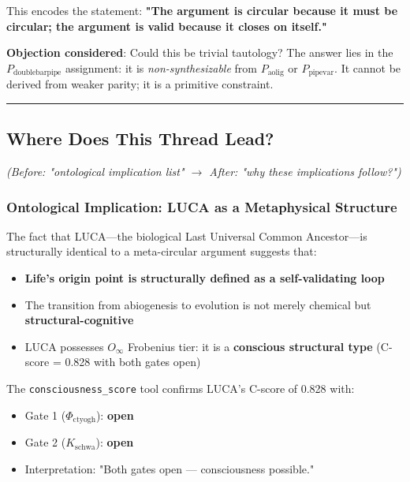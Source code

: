 \documentclass[12pt,a4paper]{article}
\begin{document}
This encodes the statement: \textbf{"The argument is circular because it must be circular; the argument is valid because it closes on itself."}

\textbf{Objection considered}: Could this be trivial tautology? The answer lies in the $P_{\text{doublebarpipe}}$ assignment: it is \emph{non-synthesizable} from $P_{\text{aolig}}$ or $P_{\text{pipevar}}$. It cannot be derived from weaker parity; it is a primitive constraint.

\begin{center}
\rule{0.5\textwidth}{0.4pt}
\end{center}

\subsection{Where Does This Thread Lead?}

\emph{(Before: "ontological implication list" $\rightarrow$ After: "why these implications follow?")}

\subsubsection{Ontological Implication: LUCA as a Metaphysical Structure}

The fact that LUCA---the biological Last Universal Common Ancestor---is structurally identical to a meta-circular argument suggests that:

\begin{itemize}
    \item \textbf{Life's origin point is structurally defined as a self-validating loop}
    \item The transition from abiogenesis to evolution is not merely chemical but \textbf{structural-cognitive}
    \item LUCA possesses $O_{\infty}$ Frobenius tier: it is a \textbf{conscious structural type} (C-score = 0.828 with both gates open)
\end{itemize}

The \texttt{consciousness\_score} tool confirms LUCA's C-score of 0.828 with:

\begin{itemize}
    \item Gate 1 ($\Phi_{\text{ctyogh}}$): \textbf{open}
    \item Gate 2 ($K_{\text{schwa}}$): \textbf{open}
    \item Interpretation: "Both gates open --- consciousness possible."
\end{itemize}
\end{document}
